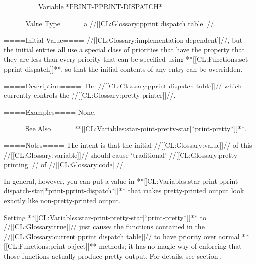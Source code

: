 ====== Variable *PRINT-PPRINT-DISPATCH* ======

====Value Type====
a //[[CL:Glossary:pprint dispatch table]]//.

====Initial Value====
//[[CL:Glossary:implementation-dependent]]//, but the initial entries all use a special class of priorities that have the property that they are less than every priority that can be specified using **[[CL:Functions:set-pprint-dispatch]]**, so that the initial contents of any entry can be overridden.

====Description====
The //[[CL:Glossary:pprint dispatch table]]// which currently controls the //[[CL:Glossary:pretty printer]]//.

====Examples====
None.

====See Also====
**[[CL:Variables:star-print-pretty-star|*print-pretty*]]**, {\secref\PPrintDispatchTables}

====Notes====
The intent is that the initial //[[CL:Glossary:value]]// of this //[[CL:Glossary:variable]]// should cause `traditional' //[[CL:Glossary:pretty printing]]// of //[[CL:Glossary:code]]//.

In general, however, you can put a value in **[[CL:Variables:star-print-pprint-dispatch-star|*print-pprint-dispatch*]]** that makes pretty-printed output look exactly like non-pretty-printed output.

Setting **[[CL:Variables:star-print-pretty-star|*print-pretty*]]** to //[[CL:Glossary:true]]// just causes the functions contained in the //[[CL:Glossary:current pprint dispatch table]]// to have priority over normal **[[CL:Functions:print-object]]** methods; it has no magic way of enforcing that those functions actually produce pretty output. For details, see section {\secref\PPrintDispatchTables}.

 
